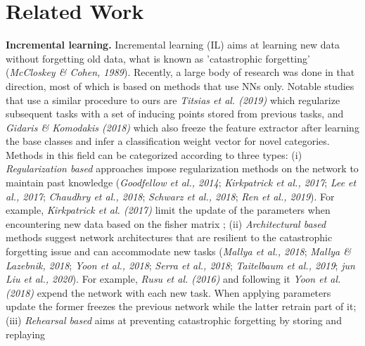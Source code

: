 \documentclass[preprint,11pt]{elsarticle}
\begin{document}
    \section{Related Work}
    \label{sec:4}
    \textbf{Incremental learning.} Incremental learning (IL) aims at
    learning new data without forgetting old data, what is known as ’catastrophic forgetting’ (\textit{McCloskey \& Cohen, 1989}\cite{mccloskey1989catastrophic}).
    Recently, a large body of research was done in that direction,
    most of which is based on methods that use NNs only. Notable
    studies that use a similar procedure to ours are \textit{Titsias
    et al. (2019)}\cite{titsias2019functional} which regularize subsequent tasks with a set
    of inducing points stored from previous tasks, and \textit{Gidaris
    \& Komodakis (2018)}\cite{gidaris2018dynamic} which also freeze the feature extractor
    after learning the base classes and infer a classification
    weight vector for novel categories. Methods in this field
    can be categorized according to three types: (i) \textit{Regularization
    based} approaches impose regularization methods on
    the network to maintain past knowledge (\textit{Goodfellow et al.,
    2014}\cite{goodfellow2014catastrophic}; \textit{Kirkpatrick et al., 2017}\cite{kirkpatrick2017overcoming}; \textit{Lee et al., 2017}\cite{lee2017overcoming}; \textit{Chaudhry
    et al., 2018}\cite{chaudhry2018riemannian}; \textit{Schwarz et al., 2018}\cite{schwarz2018progress}; \textit{Ren et al., 2019}\cite{ren2019incremental}). For
    example, \textit{Kirkpatrick et al. (2017)}\cite{kirkpatrick2017overcoming} limit the update of the
    parameters when encountering new data based on the fisher
    matrix ; (ii) \textit{Architectural based} methods suggest network
    architectures that are resilient to the catastrophic forgetting
    issue and can accommodate new tasks (\textit{Mallya et al., 2018}\cite{mallya2018packnet};
    \textit{Mallya \& Lazebnik, 2018}\cite{mallya2018piggyback}; \textit{Yoon et al., 2018}\cite{yoon2018lifelong}; \textit{Serra et al.,
    2018}\cite{serra2018overcoming}; \textit{Taitelbaum et al., 2019}\cite{taitelbaum2019network}; \textit{jun Liu et al., 2020}\cite{liu2020mnemonics}). For example,
    \textit{Rusu et al. (2016)}\cite{rusu2016progressive} and following it \textit{Yoon et al. (2018)}\cite{yoon2018lifelong}
    expend the network with each new task. When applying
    parameters update the former freezes the previous network
    while the latter retrain part of it; (iii) \textit{Rehearsal based} aims
    at preventing catastrophic forgetting by storing and replaying
\end{document}
